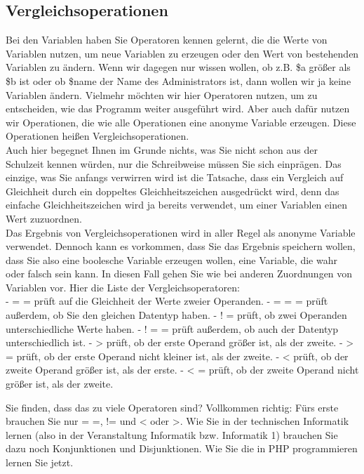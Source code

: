 \subsection{Vergleichsoperationen}

Bei den Variablen haben Sie Operatoren kennen gelernt, die die Werte von Variablen nutzen, um neue Variablen zu erzeugen oder den Wert von bestehenden Variablen zu ändern. Wenn wir dagegen nur wissen wollen, ob z.B. \$a größer als \$b ist oder ob \$name der Name des Administrators ist, dann wollen wir ja keine Variablen ändern. Vielmehr möchten wir hier Operatoren nutzen, um zu entscheiden, wie das Programm weiter ausgeführt wird. Aber auch dafür nutzen wir Operationen, die wie alle Operationen eine anonyme Variable erzeugen. Diese Operationen heißen Vergleichsoperationen.\\


Auch hier begegnet Ihnen im Grunde nichts, was Sie nicht schon aus der Schulzeit kennen würden, nur die Schreibweise müssen Sie sich einprägen. Das einzige, was Sie anfangs verwirren wird ist die Tatsache, dass ein Vergleich auf Gleichheit durch ein doppeltes Gleichheitszeichen ausgedrückt wird, denn das einfache Gleichheitszeichen wird ja bereits verwendet, um einer Variablen einen Wert zuzuordnen.\\


Das Ergebnis von Vergleichsoperationen wird in aller Regel als anonyme Variable verwendet. Dennoch kann es vorkommen, dass Sie das Ergebnis speichern wollen, dass Sie also eine boolesche Variable erzeugen wollen, eine Variable, die wahr oder falsch sein kann. In diesen Fall gehen Sie wie bei anderen Zuordnungen von Variablen vor.
Hier die Liste der Vergleichsoperatoren:\\


-	= =	prüft auf die Gleichheit der Werte zweier Operanden.
-	= = =	prüft außerdem, ob Sie den gleichen Datentyp haben.
-	! =	prüft, ob zwei Operanden unterschiedliche Werte haben.
-	! = = 	prüft außerdem, ob auch der Datentyp unterschiedlich ist.
-	>	prüft, ob der erste Operand größer ist, als der zweite.
-	> =	prüft, ob der erste Operand nicht kleiner ist, als der zweite.
-	<	prüft, ob der zweite Operand größer ist, als der erste.
-	< =	prüft, ob der zweite Operand nicht größer ist, als der zweite.

Sie finden, dass das zu viele Operatoren sind? Vollkommen richtig: Fürs erste brauchen Sie nur = =, != und < oder >. Wie Sie in der technischen Informatik lernen (also in der Veranstaltung Informatik bzw. Informatik 1) brauchen Sie dazu noch Konjunktionen und Disjunktionen. Wie Sie die in PHP programmieren lernen Sie jetzt. 

